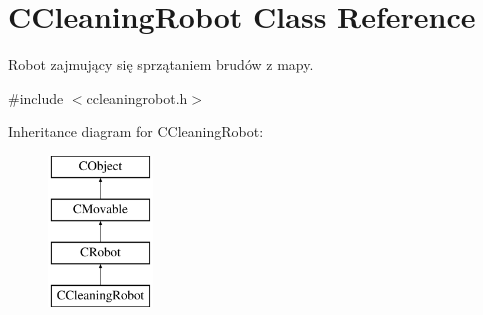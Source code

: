 \hypertarget{class_c_cleaning_robot}{}\section{C\+Cleaning\+Robot Class Reference}
\label{class_c_cleaning_robot}


Robot zajmujący się sprzątaniem brudów z mapy.  




{\ttfamily \#include $<$ccleaningrobot.\+h$>$}

Inheritance diagram for C\+Cleaning\+Robot\+:\begin{figure}[H]
\begin{center}
\leavevmode
\includegraphics[height=4.000000cm]{class_c_cleaning_robot}
\end{center}
\end{figure}
